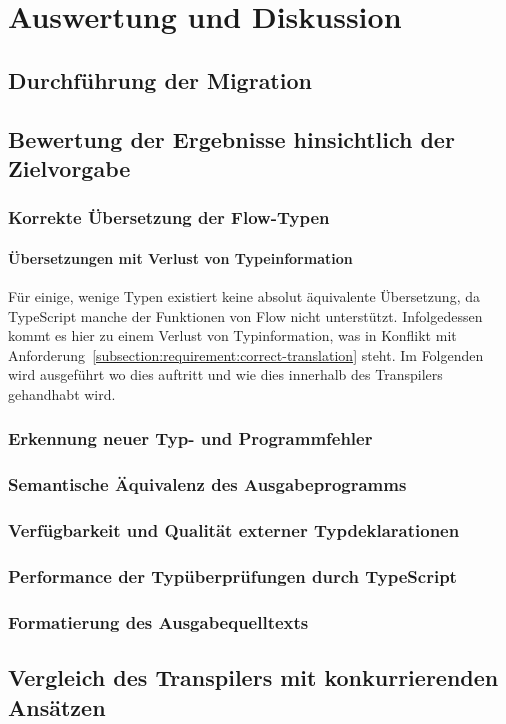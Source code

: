 \chapter{Auswertung und Diskussion}
\label{chap:evaluation}

\section{Durchführung der Migration}



\section{Bewertung der Ergebnisse hinsichtlich der Zielvorgabe}

\subsection{Korrekte Übersetzung der Flow-Typen}

\subsubsection{Übersetzungen mit Verlust von Typeinformation}

Für einige, wenige Typen existiert keine absolut äquivalente Übersetzung, da TypeScript manche der Funktionen von Flow nicht unterstützt. Infolgedessen kommt es hier zu einem Verlust von Typinformation, was in Konflikt mit Anforderung~\ref{subsection:requirement:correct-translation} steht. Im Folgenden wird ausgeführt wo dies auftritt und wie dies innerhalb des Transpilers gehandhabt wird.

\subsection{Erkennung neuer Typ- und Programmfehler}

\subsection{Semantische Äquivalenz des Ausgabeprogramms}

\subsection{Verfügbarkeit und Qualität externer Typdeklarationen}

\subsection{Performance der Typüberprüfungen durch TypeScript}

\subsection{Formatierung des Ausgabequelltexts}

\section{Vergleich des Transpilers mit konkurrierenden Ansätzen}
\label{evaluation:other-tools}
